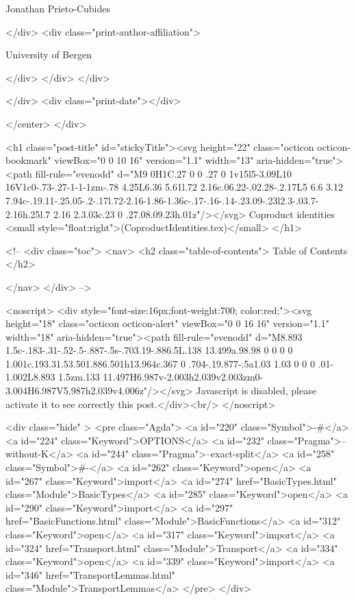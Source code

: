                   Jonathan Prieto-Cubides
                
              </div>
              <div class="print-author-affiliation">
                
                  University of Bergen
                
                </div>
            </div>
          </div>
          
          
        </div>
        <div class="print-date"></div>
        
        
    </center>
  </div>

  

  <h1 class="post-title" id="stickyTitle"><svg height="22" class="octicon octicon-bookmark" viewBox="0 0 10 16" version="1.1" width="13" aria-hidden="true"><path fill-rule="evenodd" d="M9 0H1C.27 0 0 .27 0 1v15l5-3.09L10 16V1c0-.73-.27-1-1-1zm-.78 4.25L6.36 5.61l.72 2.16c.06.22-.02.28-.2.17L5 6.6 3.12 7.94c-.19.11-.25.05-.2-.17l.72-2.16-1.86-1.36c-.17-.16-.14-.23.09-.23l2.3-.03.7-2.16h.25l.7 2.16 2.3.03c.23 0 .27.08.09.23h.01z"/></svg> Coproduct identities <small style="float:right">(CoproductIdentities.tex)</small>
  </h1>

  <!-- 
  <div class="toc">
    <nav>
    <h2 class="table-of-contents"> Table of Contents </h2>
      

    </nav>
  </div>
   -->

  <noscript>
  <div style="font-size:16px;font-weight:700; color:red;"><svg height="18" class="octicon octicon-alert" viewBox="0 0 16 16" version="1.1" width="18" aria-hidden="true"><path fill-rule="evenodd" d="M8.893 1.5c-.183-.31-.52-.5-.887-.5s-.703.19-.886.5L.138 13.499a.98.98 0 0 0 0 1.001c.193.31.53.501.886.501h13.964c.367 0 .704-.19.877-.5a1.03 1.03 0 0 0 .01-1.002L8.893 1.5zm.133 11.497H6.987v-2.003h2.039v2.003zm0-3.004H6.987V5.987h2.039v4.006z"/></svg> Javascript is disabled, please activate it to see correctly this post.</div><br/>
  </noscript>

  <div class="hide" >
<pre class="Agda">
<a id="220" class="Symbol">{-#</a> <a id="224" class="Keyword">OPTIONS</a> <a id="232" class="Pragma">--without-K</a> <a id="244" class="Pragma">--exact-split</a> <a id="258" class="Symbol">#-}</a>
<a id="262" class="Keyword">open</a> <a id="267" class="Keyword">import</a> <a id="274" href="BasicTypes.html" class="Module">BasicTypes</a>
<a id="285" class="Keyword">open</a> <a id="290" class="Keyword">import</a> <a id="297" href="BasicFunctions.html" class="Module">BasicFunctions</a>
<a id="312" class="Keyword">open</a> <a id="317" class="Keyword">import</a> <a id="324" href="Transport.html" class="Module">Transport</a>
<a id="334" class="Keyword">open</a> <a id="339" class="Keyword">import</a> <a id="346" href="TransportLemmas.html" class="Module">TransportLemmas</a>
</pre>
</div>

